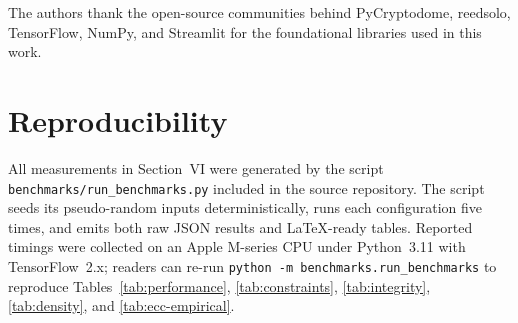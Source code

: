 \documentclass[conference]{IEEEtran}
\begin{document}
The authors thank the open-source communities behind PyCryptodome, reedsolo, TensorFlow, NumPy, and Streamlit for the foundational libraries used in this work.

\section*{Reproducibility}

All measurements in Section~VI were generated by the script \texttt{benchmarks/run\_benchmarks.py} included in the source repository. The script seeds its pseudo-random inputs deterministically, runs each configuration five times, and emits both raw JSON results and LaTeX-ready tables. Reported timings were collected on an Apple M-series CPU under Python~3.11 with TensorFlow~2.x; readers can re-run \texttt{python -m benchmarks.run\_benchmarks} to reproduce Tables~\ref{tab:performance}, \ref{tab:constraints}, \ref{tab:integrity}, \ref{tab:density}, and \ref{tab:ecc-empirical}.
\end{document}
